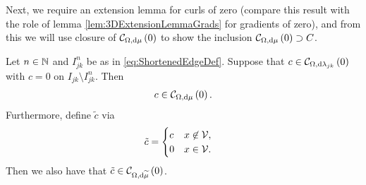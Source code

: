 Next, we require an extension lemma for curls of zero (compare this result with the role of lemma \ref{lem:3DExtensionLemmaGrads} for gradients of zero), and from this we will use closure of $\mathcal{C}_{ \Omega, \mathrm{d}\mu}\left( 0 \right)$ to show the inclusion $\mathcal{C}_{ \Omega, \mathrm{d}\mu}\left( 0 \right)\supset C$.
\begin{lemma} \label{lem:CurlZeroExtensionLemma}
	Let $n\in\mathbb{N}$ and $I_{jk}^n$ be as in \eqref{eq:ShortenedEdgeDef}.
	Suppose that $c\in\mathcal{C}_{ \Omega, \mathrm{d}\lambda_{jk}}\left( 0 \right)$ with $c=0$ on $I_{jk}\setminus I_{jk}^n$.
	Then
	\begin{align*}
		c\in\mathcal{C}_{ \Omega, \mathrm{d}\mu}\left( 0 \right).
	\end{align*}
	Furthermore, define $\tilde{c}$ via
	\begin{align*}
		\tilde{c} &= \begin{cases} c & x\not\in\mathcal{V}, \\ 0 & x\in\mathcal{V}. \end{cases}
	\end{align*}
	Then we also have that $\tilde{c}\in\mathcal{C}_{ \Omega, \mathrm{d}\widetilde{\mu}}\left( 0 \right)$.
\end{lemma}
